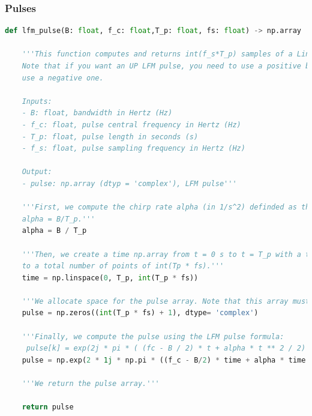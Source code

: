 \documentclass[UKenglish,8pt,aspectratio=1610]{beamer}
\begin{document}
\begin{frame}[fragile]
	\frametitle{Pulses}
\begin{lstlisting}[language=Python, style = mystyle, caption=LFM pulse generator]
def lfm_pulse(B: float, f_c: float,T_p: float, fs: float) -> np.array :

	'''This function computes and returns int(f_s*T_p) samples of a Linear Frequency Modulated (LFM).
	Note that if you want an UP LFM pulse, you need to use a positive bandwidth B. For a DOWN LFM pulse, 
	use a negative one.
	
	Inputs:
	- B: float, bandwidth in Hertz (Hz)
	- f_c: float, pulse central frequency in Hertz (Hz)
	- T_p: float, pulse length in seconds (s)
	- f_s: float, pulse sampling frequency in Hertz (Hz) 
	
	Output:
	- pulse: np.array (dtyp = 'complex'), LFM pulse'''

	'''First, we compute the chirp rate alpha (in 1/s^2) definded as the bandwidth divided by the pulse length
	alpha = B/T_p.'''
	alpha = B / T_p
	
	'''Then, we create a time np.array from t = 0 s to t = T_p with a time sampling interval of 1/fs which corresponds
	to a total number of points of int(Tp * fs).'''
	time = np.linspace(0, T_p, int(T_p * fs))
	
	'''We allocate space for the pulse array. Note that this array must be a complex array!'''
	pulse = np.zeros((int(T_p * fs) + 1), dtype= 'complex')
	
	'''Finally, we compute the pulse using the LFM pulse formula:
	 pulse[k] = exp(2j * pi * ( (fc - B / 2) * t + alpha * t ** 2 / 2) )'''
	pulse = np.exp(2 * 1j * np.pi * ((f_c - B/2) * time + alpha * time ** 2 / 2))
	
	'''We return the pulse array.'''
	
	return pulse
\end{lstlisting}
\end{frame}
\end{document}
